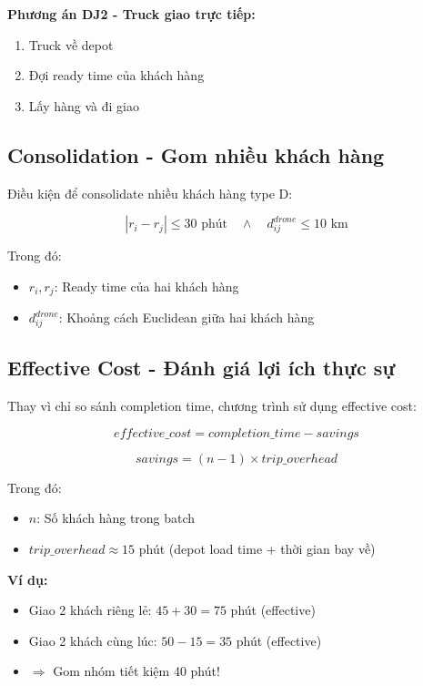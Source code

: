 \documentclass[12pt,a4paper]{article}
\begin{document}
\textbf{Phương án DJ2 - Truck giao trực tiếp:}
\begin{enumerate}
    \item Truck về depot
    \item Đợi ready time của khách hàng
    \item Lấy hàng và đi giao
\end{enumerate}

\subsection{Consolidation - Gom nhiều khách hàng}

Điều kiện để consolidate nhiều khách hàng type D:

\begin{equation}
    |r_i - r_j| \leq 30 \text{ phút} \quad \land \quad d_{ij}^{drone} \leq 10 \text{ km}
\end{equation}

Trong đó:
\begin{itemize}
    \item $r_i, r_j$: Ready time của hai khách hàng
    \item $d_{ij}^{drone}$: Khoảng cách Euclidean giữa hai khách hàng
\end{itemize}

\subsection{Effective Cost - Đánh giá lợi ích thực sự}

Thay vì chỉ so sánh completion time, chương trình sử dụng effective cost:

\begin{equation}
    effective\_cost = completion\_time - savings
\end{equation}

\begin{equation}
    savings = (n - 1) \times trip\_overhead
\end{equation}

Trong đó:
\begin{itemize}
    \item $n$: Số khách hàng trong batch
    \item $trip\_overhead \approx 15$ phút (depot load time + thời gian bay về)
\end{itemize}

\textbf{Ví dụ:}
\begin{itemize}
    \item Giao 2 khách riêng lẻ: $45 + 30 = 75$ phút (effective)
    \item Giao 2 khách cùng lúc: $50 - 15 = 35$ phút (effective)
    \item $\Rightarrow$ Gom nhóm tiết kiệm 40 phút!
\end{itemize}
\end{document}
